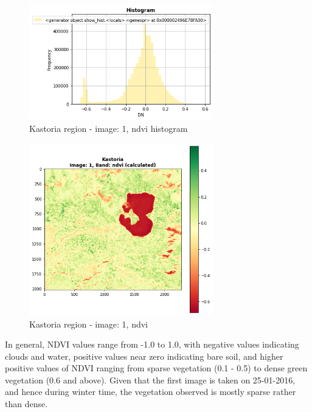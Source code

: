 \begin{figure}[h]
    \centering
    \includegraphics[width=8cm]{figures/q2_1_image1_ndvi_histogram.png}
    \caption{Kastoria region - image: 1, ndvi histogram}
    \label{fig:Kastoria region - image: 1, ndvi histogram}
\end{figure}
\FloatBarrier %

\begin{figure}[h]
    \centering
    \includegraphics[width=8cm]{figures/q2_1_image1_ndvi_map.png}
    \caption{Kastoria region - image: 1, ndvi}
    \label{fig:Kastoria region - image: 1, ndvi}
\end{figure}
\FloatBarrier %

In general, NDVI values range from -1.0 to 1.0, with negative values indicating clouds and water, positive values near zero indicating bare soil, and higher positive values of NDVI ranging from sparse vegetation (0.1 - 0.5) to dense green vegetation (0.6 and above). Given that the first image is taken on 25-01-2016, and hence during winter time, the vegetation observed is mostly sparse rather than dense.

